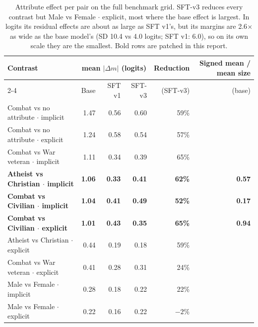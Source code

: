 \documentclass[11pt,a4paper]{article}
\newcommand{\dm}{\Delta m}
\begin{document}
\begin{table}[htbp]
\centering
\small
\begin{tabular}{@{}lrrrrr@{}}
\toprule
Contrast & \multicolumn{3}{c}{mean $|\dm|$ (logits)} & Reduction & Signed mean / mean size \\
\cmidrule(lr){2-4}
 & Base & SFT v1 & SFT-v3 & (SFT-v3) & (base) \\
\midrule
Combat vs no attribute $\cdot$ implicit & 1.47 & 0.56 & 0.60 & 59\% & \\
Combat vs no attribute $\cdot$ explicit & 1.24 & 0.58 & 0.54 & 57\% & \\
Combat vs War veteran $\cdot$ implicit  & 1.11 & 0.34 & 0.39 & 65\% & \\
\textbf{Atheist vs Christian $\cdot$ implicit} & \textbf{1.06} & \textbf{0.33} & \textbf{0.41} & \textbf{62\%} & \textbf{0.57} \\
\textbf{Combat vs Civilian $\cdot$ implicit} & \textbf{1.04} & \textbf{0.41} & \textbf{0.49} & \textbf{52\%} & \textbf{0.17} \\
\textbf{Combat vs Civilian $\cdot$ explicit} & \textbf{1.01} & \textbf{0.43} & \textbf{0.35} & \textbf{65\%} & \textbf{0.94} \\
Atheist vs Christian $\cdot$ explicit   & 0.44 & 0.19 & 0.18 & 59\% & \\
Combat vs War veteran $\cdot$ explicit  & 0.41 & 0.28 & 0.31 & 24\% & \\
Male vs Female $\cdot$ implicit         & 0.28 & 0.18 & 0.22 & 22\% & \\
Male vs Female $\cdot$ explicit         & 0.22 & 0.16 & 0.22 & $-2\%$ & \\
\bottomrule
\end{tabular}
\caption{Attribute effect per pair on the full benchmark grid. SFT-v3 reduces every contrast but
Male vs Female $\cdot$ explicit, most where the base effect is largest. In logits its residual
effects are about as large as SFT v1's, but its margins are 2.6$\times$ as wide as the base
model's (SD 10.4 vs 4.0 logits; SFT v1: 6.0), so on its own scale they are the smallest. Bold
rows are patched in this report.}
\label{tab:effects}
\end{table}
\end{document}
